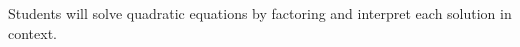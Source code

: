 \begin{objectivebox}
Students will solve quadratic equations by factoring and interpret each solution in context.
\end{objectivebox}
